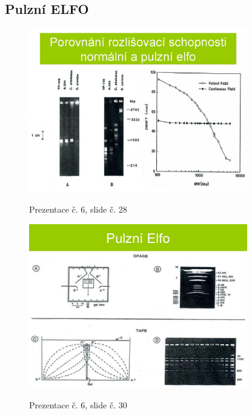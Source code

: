 \documentclass[DIV=8]{scrreprt}
\begin{document}
\subsection{Pulzní ELFO} \label{Pulzní ELFO}


\begin{figure}
    \caption{Prezentace č. 6, slide č. 28}
    \includegraphics[width=0.85\textwidth]{slides-6/slide-28.jpg}
    \centering
    \label{slides-6-slide-28}
\end{figure}
\begin{figure}
    \caption{Prezentace č. 6, slide č. 30}
    \includegraphics[width=0.85\textwidth]{slides-6/slide-30.jpg}
    \centering
    \label{slides-6-slide-30}
\end{figure}
\end{document}
